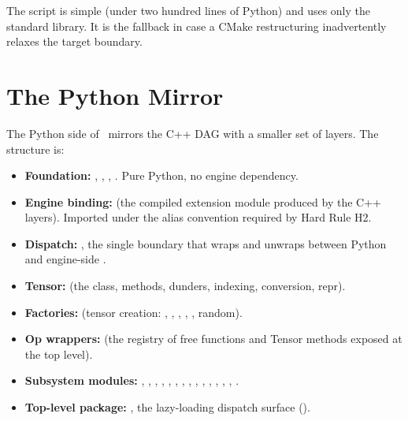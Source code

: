 The script is simple (under two hundred lines of Python) and uses
only the standard library. It is the fallback in case a CMake
restructuring inadvertently relaxes the target boundary.

\section{The Python Mirror}
\label{sec:layered_dag:python_mirror}

The Python side of \Lucid\ mirrors the C++ DAG with a smaller set
of layers. The structure is:

\begin{itemize}
  \item \textbf{Foundation:} ,
    , ,
    . Pure Python, no engine dependency.
  \item \textbf{Engine binding:}  (the compiled
    extension module produced by the C++ layers). Imported under
    the  alias convention required by Hard Rule
    H2.
  \item \textbf{Dispatch:} , the single
    boundary that wraps and unwraps between Python 
    and engine-side .
  \item \textbf{Tensor:}  (the 
    class, methods, dunders, indexing, conversion, repr).
  \item \textbf{Factories:}  (tensor
    creation: , , ,
    , , random).
  \item \textbf{Op wrappers:}  (the registry
    of free functions and Tensor methods exposed at the top level).
  \item \textbf{Subsystem modules:} ,
    , , ,
    , ,
    , ,
    , , ,
    , ,
    , .
  \item \textbf{Top-level package:} ,
    the lazy-loading dispatch surface
    ().
\end{itemize}

